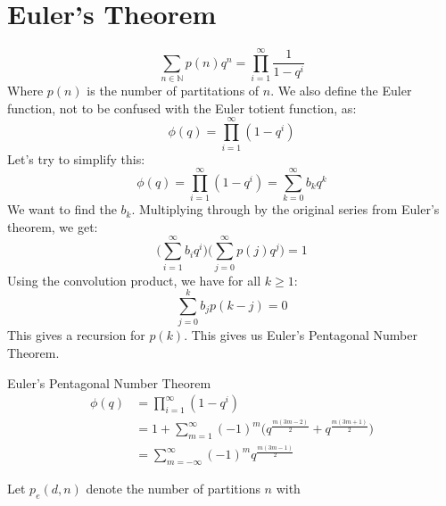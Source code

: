 \documentclass[crop=false,class=book,oneside]{standalone}
\begin{document}
    \section{Euler's Theorem}
        \begin{equation}
            \sum_{n\in\mathbb{N}}p(n)q^{n}=
            \prod_{i=1}^{\infty}\frac{1}{1-q^{i}}
        \end{equation}
        Where $p(n)$ is the number of partitations of $n$.
        We also define the Euler function, not to be confused
        with the Euler totient function, as:
        \begin{equation}
            \phi(q)=\prod_{i=1}^{\infty}(1-q^{i})
        \end{equation}
        Let's try to simplify this:
        \begin{equation}
            \phi(q)=\prod_{i=1}^{\infty}(1-q^{i})=
            \sum_{k=0}^{\infty}b_{k}q^{k}
        \end{equation}
        We want to find the $b_{k}$. Multiplying through by
        the original series from Euler's theorem, we get:
        \begin{equation}
            \Big(\sum_{i=1}^{\infty}b_{i}q^{i}\Big)
            \Big(\sum_{j=0}^{\infty}p(j)q^{j}\Big)=1
        \end{equation}
        Using the convolution product, we have for all $k\geq{1}$:
        \begin{equation}
            \sum_{j=0}^{k}b_{j}p(k-j)=0
        \end{equation}
        This gives a recursion for $p(k)$. This gives us
        Euler's Pentagonal Number Theorem.
        \begin{ltheorem}{Euler's Pentagonal Number Theorem}
            \begin{subequations}
                \begin{align}
                    \phi(q)&=\prod_{i=1}^{\infty}(1-q^{i})\\
                    &=1+\sum_{m=1}^{\infty}(\minus{1})^{m}
                    \Big(q^{\frac{m(3m-2)}{2}}+
                        q^{\frac{m(3m+1)}{2}}\Big)\\
                    &=\sum_{m=\minus\infty}^{\infty}
                        (\minus{1})^{m}q^{\frac{m(3m-1)}{2}}
                \end{align}
            \end{subequations}
        \end{ltheorem}
        Let $p_{e}(d,n)$ denote the number of partitions $n$ with
\end{document}

